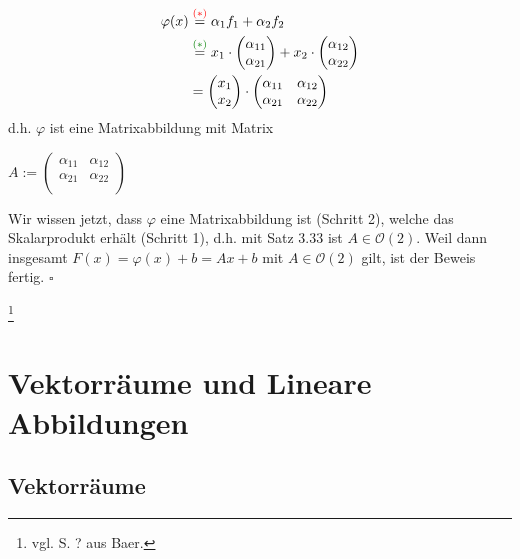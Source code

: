 \documentclass{article}
\begin{document}
\begin{align*}
    \varphi(x) &\overset{\textcolor{red}{(*)}}{=} \alpha_1 f_1 + \alpha_2 f_2 \\
    & \overset{\textcolor{darkgreen}{(*)}}{=} x_1 \cdot \begin{pmatrix}
        \alpha_{11} \\
        \alpha_{21} \\
    \end{pmatrix} + x_2 \cdot \begin{pmatrix}
        \alpha_{12} \\
        \alpha_{22} \\
    \end{pmatrix} \\
    &= \begin{pmatrix}
        x_1 \\
        x_2 \\
    \end{pmatrix} \cdot \begin{pmatrix}
        \alpha_{11} & \alpha_{12} \\
        \alpha_{21} & \alpha_{22} \\
    \end{pmatrix} \\
\end{align*}
d.h. $\varphi$ ist eine Matrixabbildung mit Matrix \\
\begin{center}
    $A := \begin{pmatrix}
        \alpha_{11} & \alpha_{12} \\
        \alpha_{21} & \alpha_{22} \\
    \end{pmatrix}$ \\
\end{center}
Wir wissen jetzt, dass $\varphi$ eine Matrixabbildung ist (Schritt 2), welche das Skalarprodukt erhält (Schritt 1), d.h. mit Satz 3.33 ist $A \in \mathcal{O}(2)$. 
Weil dann insgesamt $F(x) = \varphi(x) + b = Ax + b$ mit $A \in \mathcal{O}(2)$ gilt, ist der Beweis fertig. $\square$ \\


\newpage
\date{Mittwoch, 03.01.24} \footnote{vgl. S. ? aus Baer.}
\section{Vektorräume und Lineare Abbildungen}
\subsection{Vektorräume}
\end{document}
